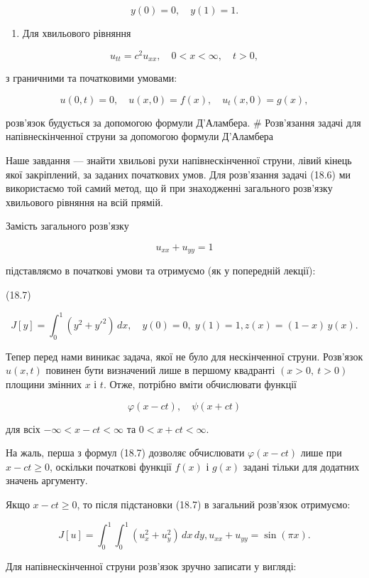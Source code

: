 \documentclass[
  ukrainian,
]{article}
\providecommand{\tightlist}{%
  \setlength{\itemsep}{0pt}\setlength{\parskip}{0pt}}
\begin{document}
\[
y(0)=0,\quad y(1)=1.
\]

\begin{enumerate}
\def\labelenumi{\arabic{enumi}.}
\setcounter{enumi}{1}
\tightlist
\item
  Для хвильового рівняння
\end{enumerate}

\[
u_{tt}=c^2u_{xx}, \quad 0<x<\infty,\quad t>0,
\]

з граничними та початковими умовами:

\[
u(0,t)=0,\quad u(x,0)=f(x),\quad u_t(x,0)=g(x),
\]

розв'язок будується за допомогою формули Д'Аламбера. \# Розв'язання
задачі для напівнескінченної струни за допомогою формули Д'Аламбера

Наше завдання --- знайти хвильові рухи напівнескінченної струни, лівий
кінець якої закріплений, за заданих початкових умов. Для розв'язання
задачі (18.6) ми використаємо той самий метод, що й при знаходженні
загального розв'язку хвильового рівняння на всій прямій.

Замість загального розв'язку

\[
u_{xx} + u_{yy} = 1
\]

підставляємо в початкові умови та отримуємо (як у попередній лекції):

(18.7)

\[
J[y] = \int_{0}^{1} (y^{2} + {y'}^{2})\,dx,\quad y(0) = 0,\; y(1) = 1,
z(x) = (1 - x)\, y(x).
\]

Тепер перед нами виникає задача, якої не було для нескінченної струни.
Розв'язок \(u(x,t)\) повинен бути визначений лише в першому квадранті
\((x>0,\ t>0)\) площини змінних \(x\) і \(t\). Отже, потрібно вміти
обчислювати функції

\[
\varphi(x-ct), \quad \psi(x+ct)
\]

для всіх \(-\infty < x-ct < \infty\) та \(0 < x+ct < \infty\).

На жаль, перша з формул (18.7) дозволяє обчислювати \(\varphi(x-ct)\)
лише при \(x-ct \ge 0\), оскільки початкові функції \(f(x)\) і \(g(x)\)
задані тільки для додатних значень аргументу.

Якщо \(x - ct \ge 0\), то після підстановки (18.7) в загальний розв'язок
отримуємо:

\[
J[u] = \int_{0}^{1} \int_{0}^{1} (u_{x}^{2} + u_{y}^{2})\,dx\,dy,
u_{xx} + u_{yy} = \sin(\pi x).
\]

Для напівнескінченної струни розв'язок зручно записати у вигляді:
\end{document}
